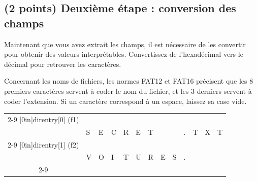 \documentclass[11pt,a4paper]{article}
\begin{document}

\subsection{(2 points) Deuxième étape : conversion des champs }

Maintenant que vous avez extrait les champs, il est nécessaire de les convertir pour obtenir des valeurs interprétables.
Convertissez de l'hexadécimal vers le décimal pour retrouver les caractères.

Concernant les noms de fichiers, les normes FAT12 et FAT16 précisent que les 8 premiers caractères servent à coder le nom du fichier, et les 3 derniers servent à coder l'extension.
Si un caractère correspond à un espace, laissez sa case vide.

\medskip

\begin{center}


\begin{tabular}{ c   | m{0.45cm} | m{0.45cm} | m{0.45cm} | m{0.45cm} | m{0.45cm} | m{0.45cm} | m{0.45cm} | m{0.45cm} | c | m{0.45cm} | m{0.45cm} | m{0.45cm} | }
\cline{2-9} \cline{11-13}
\multirow[c]{2}{*}[0in]{direntry[0] (f1)}  &   &   &   &   &   &   &   &   &     &   &   &   \\
                                           & S & E & C & R & E & T &   &   &  .  & T & X & T \\
\cline{2-9} \cline{11-13}
\multirow[c]{2}{*}[0in]{direntry[1] (f2)}  &   &   &   &   &   &   &   &   &     &   &   &   \\
                                           & V & O & I & T & U & R & E & S &  .  &   &   &   \\
\cline{2-9} \cline{11-13}
\end{tabular}

\end{center}
\end{document}
